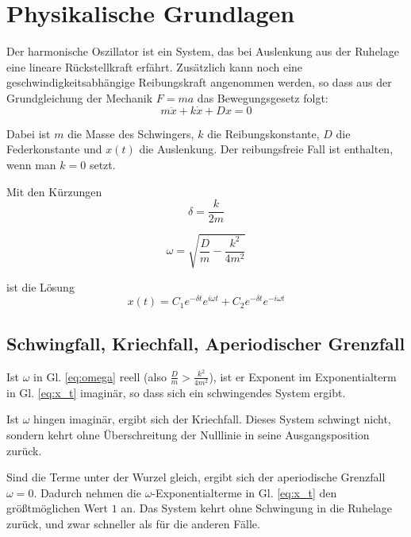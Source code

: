 \documentclass[a4paper,german,12pt,smallheadings]{scrartcl}
\begin{document}
\begin{titlepage}

\end{titlepage}

\allowdisplaybreaks %

\section{Physikalische Grundlagen}
Der harmonische Oszillator ist ein System, das bei Auslenkung aus der Ruhelage
eine lineare Rückstellkraft erfährt. Zusätzlich kann noch eine
geschwindigkeitsabhängige Reibungskraft angenommen werden, so dass aus der
Grundgleichung der Mechanik $F=ma$ das Bewegungsgesetz folgt:
\begin{equation}
  m \ddot{x} + k \dot{x} + D x = 0
\end{equation}

Dabei ist $m$ die Masse des Schwingers, $k$ die Reibungskonstante, $D$ die
Federkonstante und $x(t)$ die Auslenkung. Der reibungsfreie Fall ist enthalten,
wenn man $k=0$ setzt.

Mit den Kürzungen
\begin{equation}
  \delta = \frac{k}{2m}
  \label{eq:delta}
\end{equation}

\begin{equation}
  \omega = \sqrt{\frac{D}{m} - \frac{k^2}{4m^2}}
  \label{eq:omega}
\end{equation}

ist die Lösung
\begin{equation}
  x(t) = C_1 e^{- \delta t} e^{i \omega t} + C_2 e^{-\delta t} e^{-i \omega t}
  \label{eq:x_t}
\end{equation}

\subsection{Schwingfall, Kriechfall, Aperiodischer Grenzfall}
Ist $\omega$ in Gl. \ref{eq:omega} reell (also $\frac{D}{m} >
\frac{k^2}{4m^2}$), ist er Exponent im Exponentialterm in Gl. \ref{eq:x_t}
imaginär, so dass sich ein schwingendes System ergibt.

Ist $\omega$ hingen imaginär, ergibt sich der Kriechfall. Dieses System
schwingt nicht, sondern kehrt ohne Überschreitung der Nulllinie in seine
Ausgangsposition zurück.

Sind die Terme unter der Wurzel gleich, ergibt sich der aperiodische Grenzfall
$\omega = 0$. Dadurch nehmen die $\omega$-Exponentialterme in Gl. \ref{eq:x_t}
den größtmöglichen Wert $1$ an. Das System kehrt ohne Schwingung in die
Ruhelage zurück, und zwar schneller als für die anderen Fälle.
\end{document}
